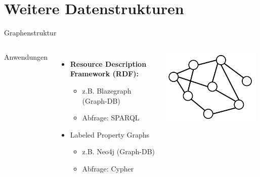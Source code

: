 

\section{Weitere Datenstrukturen}


\begin{frame}[fragile]{Graphenstruktur}
  \begin{columns}[T,onlytextwidth]
    Anwendungen
      \begin{itemize}\footnotesize
          \item \textbf{Resource Description Framework (RDF):} 
          \begin{itemize}\footnotesize
              \item z.B. Blazegraph (Graph-DB)
              \item Abfrage: SPARQL
          \end{itemize}
          \item Labeled Property Graphs
          \begin{itemize}\footnotesize
              \item z.B. Neo4j (Graph-DB)
              \item Abfrage: Cypher
          \end{itemize}
      \end{itemize}
      
      \begin{block}{}
        \includegraphics[width=0.97\textwidth]{img/graph.png}
      \end{block}



\end{columns}
\end{frame}

